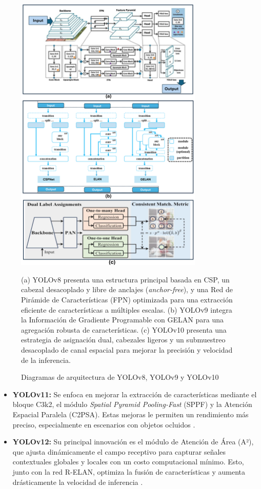 \documentclass[12pt,a4paper,onecolumn,oneside]{report}
\begin{document}
\begin{figure}[htbp]
  \centering
  \includegraphics[width=0.8\textwidth]{figuras/arquitecture YOLO/v8_v9_v10.png}
  \caption{Diagramas de arquitectura de YOLOv8, YOLOv9 y YOLOv10}
  \label{fig:Yolov8_v9_v10_arquitectures}
  (a) YOLOv8 presenta una estructura principal basada en CSP, un cabezal desacoplado y libre de anclajes (\textit{anchor-free}), y una Red de Pirámide de Características (FPN) optimizada para una extracción eficiente de características a múltiples escalas. 
  (b) YOLOv9 integra la Información de Gradiente Programable con GELAN para una agregación robusta de características.
  (c) YOLOv10 presenta una estrategia de asignación dual, cabezales ligeros y un submuestreo desacoplado de canal espacial para mejorar la precisión y velocidad de la inferencia.
\end{figure}

\begin{itemize}
  \item \textbf{YOLOv11:} Se enfoca en mejorar la extracción de características mediante el bloque C3k2, el módulo \textit{Spatial Pyramid Pooling-Fast} (SPPF) y la Atención Espacial Paralela (C2PSA). Estas mejoras le permiten un rendimiento más preciso, especialmente en escenarios con objetos ocluidos \cite{defyolos}.
  \item \textbf{YOLOv12:} Su principal innovación es el módulo de Atención de Área (A²), que ajusta dinámicamente el campo receptivo para capturar señales contextuales globales y locales con un costo computacional mínimo. Esto, junto con la red R-ELAN, optimiza la fusión de características y aumenta drásticamente la velocidad de inferencia \cite{defyolos}.
\end{itemize}
\end{document}

